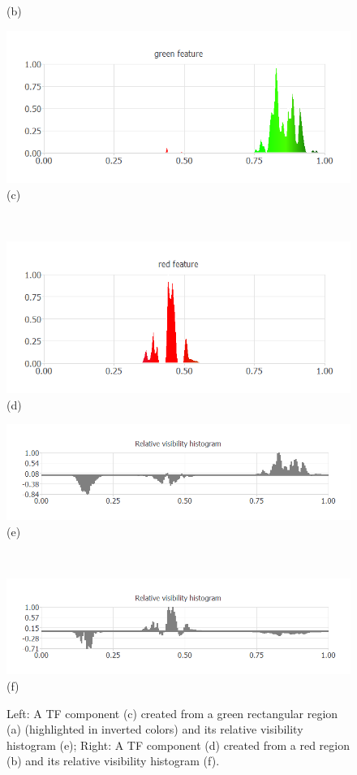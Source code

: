 \documentclass[twoside,twocolumn,10pt]{article}
\begin{document}
\begin{figure}
\begin{minipage}{.16\textwidth}
(b)
	\end{minipage}
	\begin{minipage}{.16\textwidth}
	\centering
	\includegraphics[width=1\linewidth]{nucleon_Green_feature}
(c)
	\end{minipage}~
	\begin{minipage}{.16\textwidth}
		\centering
		\includegraphics[width=1\linewidth]{nucleon_Red_feature}
(d)
	\end{minipage}
	\begin{minipage}{.16\textwidth}
		\centering
		\includegraphics[width=1\linewidth]{nucleon_green_Relative_visibility_histogram}
(e)
	\end{minipage}~
	\begin{minipage}{.16\textwidth}
		\centering
		\includegraphics[width=1\linewidth]{nucleon_red_Relative_visibility_histogram}
(f)
	\end{minipage}
	\caption{Left: A TF component (c) created from a green rectangular region (a) (highlighted in inverted colors) and its relative visibility histogram (e); Right: A TF component (d) created from a red region (b) and its relative visibility histogram (f).}
	\label{fig:nucleon_features}
\end{figure}
\end{document}
